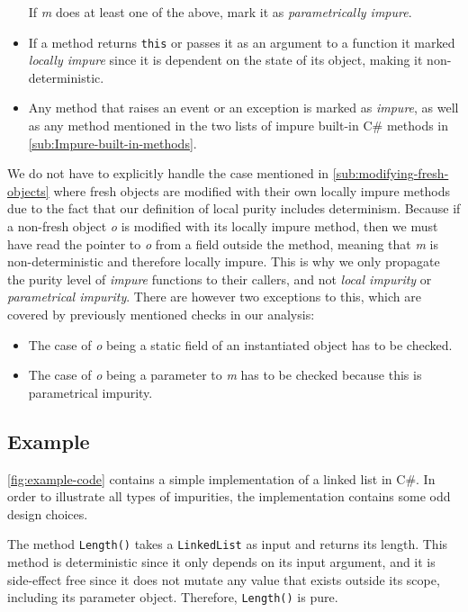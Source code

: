 \documentclass[a4paper,12pt]{article}
\begin{document}
\begin{itemize}
\begin{itemize}
    \end{itemize}
    If \textit{m} does at least one of the above, mark it as \textit{parametrically impure}.
  \item If a method returns \texttt{this} or passes it as an argument to a function it marked \textit{locally impure} since it is dependent on the state of its object, making it non-deterministic.
  \item Any method that raises an event or an exception is marked as \textit{impure}, as well as any method mentioned in the two lists of impure built-in C\# methods in \autoref{sub:Impure-built-in-methods}.
\end{itemize}

We do not have to explicitly handle the case mentioned in \autoref{sub:modifying-fresh-objects} where fresh objects are modified with their own locally impure methods due to the fact that our definition of local purity includes determinism. Because if a non-fresh object \textit{o} is modified with its locally impure method, then we must have read the pointer to \textit{o} from a field outside the method, meaning that \textit{m} is non-deterministic and therefore locally impure. This is why we only propagate the purity level of \textit{impure} functions to their callers, and not \textit{local impurity} or \textit{parametrical impurity}. There are however two exceptions to this, which are covered by previously mentioned checks in our analysis:
\begin{itemize}
  \item The case of \textit{o} being a static field of an instantiated object has to be checked.
  \item The case of \textit{o} being a parameter to \textit{m} has to be checked because this is parametrical impurity.
\end{itemize}

\subsection{Example} \label{ssub:Example}
\autoref{fig:example-code} contains a simple implementation of a linked list in C\#. In order to illustrate all types of impurities, the implementation contains some odd design choices.

The method \texttt{Length()} takes a \texttt{LinkedList} as input and returns its length. This method is deterministic since it only depends on its input argument, and it is side-effect free since it does not mutate any value that exists outside its scope, including its parameter object. Therefore, \texttt{Length()} is pure.
\end{document}
